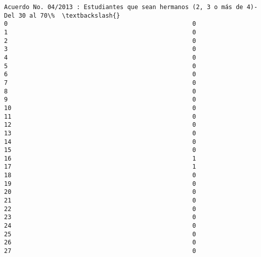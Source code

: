 \documentclass[11pt]{article}
\begin{document}
\begin{Verbatim}[commandchars=\\\{\}]
    Acuerdo No. 04/2013 : Estudiantes que sean hermanos (2, 3 o más de 4)-Del 30 al 70\%  \textbackslash{}
0                                                   0                                     
1                                                   0                                     
2                                                   0                                     
3                                                   0                                     
4                                                   0                                     
5                                                   0                                     
6                                                   0                                     
7                                                   0                                     
8                                                   0                                     
9                                                   0                                     
10                                                  0                                     
11                                                  0                                     
12                                                  0                                     
13                                                  0                                     
14                                                  0                                     
15                                                  0                                     
16                                                  1                                     
17                                                  1                                     
18                                                  0                                     
19                                                  0                                     
20                                                  0                                     
21                                                  0                                     
22                                                  0                                     
23                                                  0                                     
24                                                  0                                     
25                                                  0                                     
26                                                  0                                     
27                                                  0                                     

\end{Verbatim}
\end{document}
